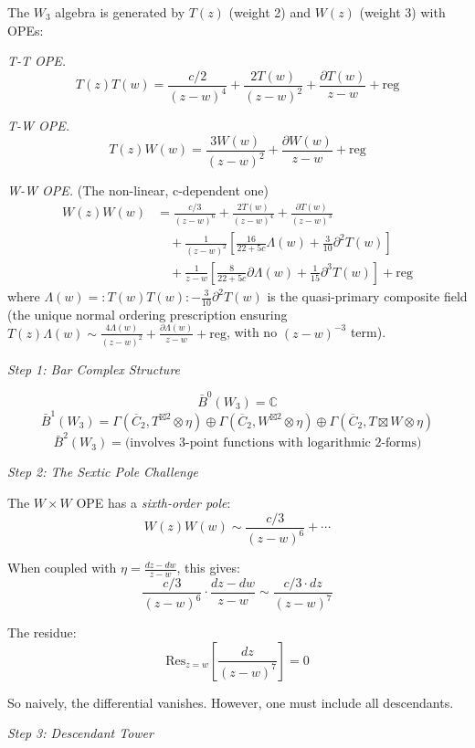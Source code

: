 \begin{example}
\label{ex:w3-completion-full}

The $W_3$ algebra is generated by $T(z)$ (weight 2) and $W(z)$ (weight 3) with OPEs:

\emph{T-T OPE.}
\[T(z)T(w) = \frac{c/2}{(z-w)^4} + \frac{2T(w)}{(z-w)^2} + \frac{\partial T(w)}{z-w} + \text{reg}\]

\emph{T-W OPE.}
\[T(z)W(w) = \frac{3W(w)}{(z-w)^2} + \frac{\partial W(w)}{z-w} + \text{reg}\]

\emph{W-W OPE.} (The non-linear, c-dependent one)
\begin{align*}
W(z)W(w) &= \frac{c/3}{(z-w)^6} + \frac{2T(w)}{(z-w)^4} + \frac{\partial T(w)}{(z-w)^3} \\
&\quad + \frac{1}{(z-w)^2}\left[\frac{16}{22+5c} \Lambda(w) + \frac{3}{10}\partial^2 T(w)\right] \\
&\quad + \frac{1}{z-w}\left[\frac{8}{22+5c}\partial\Lambda(w) + \frac{1}{15}\partial^3 T(w)\right] + \text{reg}
\end{align*}
where $\Lambda(w) = :T(w)T(w): - \frac{3}{10}\partial^2 T(w)$ is the quasi-primary composite field
(the unique normal ordering prescription ensuring $T(z)\Lambda(w) \sim \frac{4\Lambda(w)}{(z-w)^2} + \frac{\partial\Lambda(w)}{z-w} + \text{reg}$, with no $(z-w)^{-3}$ term).

\medskip
\noindent\emph{Step 1: Bar Complex Structure}

\[\bar{B}^0(W_3) = \mathbb{C}\]
\[\bar{B}^1(W_3) = \Gamma(\overline{C}_2, T^{\boxtimes 2} \otimes \eta) \oplus \Gamma(\overline{C}_2, W^{\boxtimes 2} \otimes \eta) \oplus \Gamma(\overline{C}_2, T \boxtimes W \otimes \eta)\]
\[\bar{B}^2(W_3) = \text{(involves 3-point functions with logarithmic 2-forms)}\]

\medskip
\noindent\emph{Step 2: The Sextic Pole Challenge}

The $W \times W$ OPE has a \emph{sixth-order pole}:
\[W(z)W(w) \sim \frac{c/3}{(z-w)^6} + \cdots\]

When coupled with $\eta = \frac{dz-dw}{z-w}$, this gives:
\[\frac{c/3}{(z-w)^6} \cdot \frac{dz-dw}{z-w} \sim \frac{c/3 \cdot dz}{(z-w)^7}\]

The residue:
\[\text{Res}_{z=w}\left[\frac{dz}{(z-w)^7}\right] = 0\]

So naively, the differential vanishes. However, one must include all descendants.

\medskip
\noindent\emph{Step 3: Descendant Tower}


\end{example}
